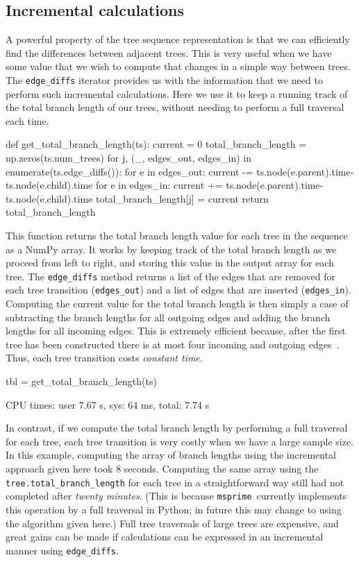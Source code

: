 \documentclass[graybox]{svmult}
\newcommand{\msprime}[0]{\texttt{msprime}}
\begin{document}
\subsection{Incremental calculations}\label{incremental-calculations}

A powerful property of the tree sequence representation is that we can
efficiently find the differences between adjacent trees. This is very
useful when we have some value that we wish to compute that changes in a
simple way between trees. The \texttt{edge\_diffs} iterator provides us
with the information that we need to perform such incremental
calculations. Here we use it to keep a running track of the total branch
length of our trees, without needing to perform a full traversal each
time.

\begin{pythoncode}
def get_total_branch_length(ts):
  current = 0
  total_branch_length = np.zeros(ts.num_trees)
  for j, (_, edges_out, edges_in) in enumerate(ts.edge_diffs()):
    for e in edges_out:
        current -= ts.node(e.parent).time-ts.node(e.child).time
    for e in edges_in:
        current += ts.node(e.parent).time-ts.node(e.child).time
    total_branch_length[j] = current
  return total_branch_length
\end{pythoncode}

    This function returns the total branch length value for each tree in the
sequence as a NumPy array. It works by keeping track of the total branch
length as we proceed from left to right, and storing this value in the
output array for each tree. The \texttt{edge\_diffs} method returns a
list of the edges that are removed for each tree transition
(\texttt{edges\_out}) and a list of edges that are inserted
(\texttt{edges\_in}). Computing the current value for the total branch
length is then simply a case of subtracting the branch lengths for all
outgoing edges and adding the branch lengths for all incoming edges.
This is extremely efficient because, after the first tree has been
constructed there is at most four incoming and outgoing edges~\citep{kelleher2016efficient}. Thus,
each tree transition costs \emph{constant time}.

\begin{pythoncode}
tbl = get_total_branch_length(ts)

CPU times: user 7.67 s, sys: 64 ms, total: 7.74 s
\end{pythoncode}

In contrast, if we compute the total branch length by performing a
full traversal for each tree, each tree transition is very costly
when we have a large sample size. In this example, computing the array of branch lengths
using the incremental approach given here took 8 seconds. Computing the
same array using the \texttt{tree.total\_branch\_length} for each tree
in a straightforward way still had not completed after \emph{twenty
minutes}. (This is because \msprime\ currently implements this operation
by a full traversal in Python; in future this may change to using the
algorithm given here.) Full tree traversals of large trees are
expensive, and great gains can be made if calculations can be expressed
in an incremental manner using \texttt{edge\_diffs}.
\end{document}
